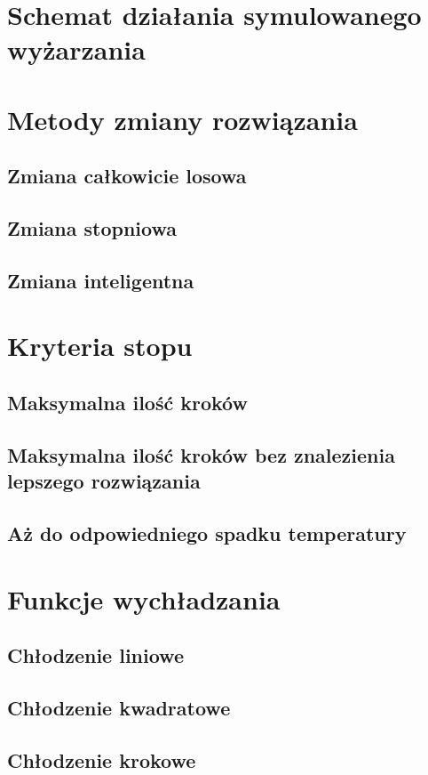 \section{Schemat działania symulowanego wyżarzania}

\section{Metody zmiany rozwiązania}
\subsection{Zmiana całkowicie losowa}
\subsection{Zmiana stopniowa}
\subsection{Zmiana inteligentna}

\section{Kryteria stopu}
\subsection{Maksymalna ilość kroków}
\subsection{Maksymalna ilość kroków bez znalezienia lepszego rozwiązania}
\subsection{Aż do odpowiedniego spadku temperatury}

\section{Funkcje wychładzania}
\subsection{Chłodzenie liniowe}
\subsection{Chłodzenie kwadratowe}
\subsection{Chłodzenie krokowe}
